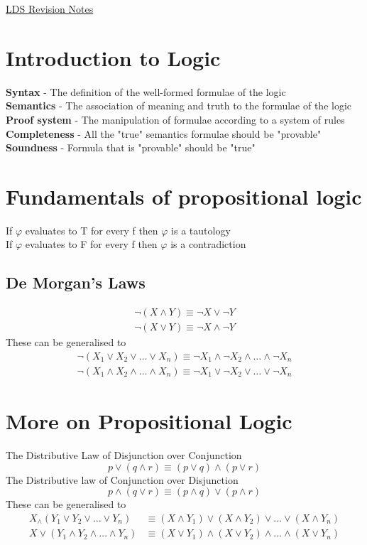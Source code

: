 \documentclass{article}[18pt]
\begin{document}
\begin{center}
\underline{\huge LDS Revision Notes}
\end{center}
\section{Introduction to Logic}
\textbf{Syntax} - The definition of the well-formed formulae of the logic\\
\textbf{Semantics} - The association of meaning and truth to the formulae of the logic\\
\textbf{Proof system} - The manipulation of formulae according to a system of rules\\
\textbf{Completeness} - All the "true" semantics formulae should be "provable"\\
\textbf{Soundness} - Formula that is "provable" should be "true"
\section{Fundamentals of propositional logic}
If $\varphi$ evaluates to T for every f then $\varphi$ is a tautology\\
If $\varphi$ evaluates to F for every f then $\varphi$ is a contradiction
\subsection{De Morgan's Laws}
\[
\begin{array}{l}{\neg(X \wedge Y) \equiv \neg X \vee \neg Y} \\ {\neg(X \vee Y) \equiv \neg X \wedge \neg Y}\end{array}
\]
These can be generalised to
\[
\begin{array}{l}{\neg\left(X_{1} \vee X_{2} \vee \ldots \vee X_{n}\right) \equiv \neg X_{1} \wedge \neg X_{2} \wedge \ldots \wedge \neg X_{n}} \\ {\neg\left(X_{1} \wedge X_{2} \wedge \ldots \wedge X_{n}\right) \equiv \neg X_{1} \vee \neg X_{2} \vee \ldots \vee \neg X_{n}}\end{array}
\]
\section{More on Propositional Logic}
The Distributive Law of Disjunction over Conjunction
\[
p \vee(q \wedge r) \equiv(p \vee q) \wedge(p \vee r)
\]
The Distributive law of Conjunction over Disjunction
\[
p \wedge(q \vee r) \equiv(p \wedge q) \vee(p \wedge r)
\]
These can be generalised to
\[
\begin{aligned} X_{\wedge}\left(Y_{1} \vee Y_{2} \vee \ldots \vee Y_{n}\right) & \equiv\left(X \wedge Y_{1}\right) \vee\left(X \wedge Y_{2}\right) \vee \ldots \vee\left(X \wedge Y_{n}\right) \\ X \vee\left(Y_{1} \wedge Y_{2} \wedge \ldots \wedge Y_{n}\right) & \equiv\left(X \vee Y_{1}\right) \wedge\left(X \vee Y_{2}\right) \wedge \ldots \wedge\left(X \vee Y_{n}\right) \end{aligned}
\]
\end{document}
